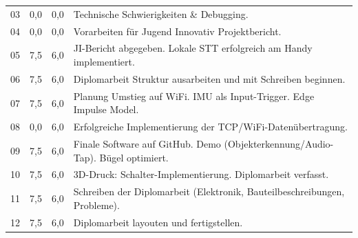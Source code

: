 \begin{longtable}{l r r p{\dimexpr\textwidth-4.5cm\relax}}
03 & 0,0 & 0,0 & Technische Schwierigkeiten \& Debugging. \\
04 & 0,0 & 0,0 & Vorarbeiten für Jugend Innovativ Projektbericht. \\
05 & 7,5 & 6,0 & JI-Bericht abgegeben. Lokale STT erfolgreich am Handy implementiert. \\
06 & 7,5 & 6,0 & Diplomarbeit Struktur ausarbeiten und mit Schreiben beginnen. \\
07 & 7,5 & 6,0 & Planung Umstieg auf WiFi. IMU als Input-Trigger. Edge Impulse Model. \\
08 & 0,0 & 6,0 & Erfolgreiche Implementierung der TCP/WiFi-Datenübertragung. \\
09 & 7,5 & 6,0 & Finale Software auf GitHub. Demo (Objekterkennung/Audio-Tap). Bügel optimiert. \\
10 & 7,5 & 6,0 & 3D-Druck: Schalter-Implementierung. Diplomarbeit verfasst. \\
11 & 7,5 & 6,0 & Schreiben der Diplomarbeit (Elektronik, Bauteilbeschreibungen, Probleme). \\
12 & 7,5 & 6,0 & Diplomarbeit layouten und fertigstellen. \\
\end{longtable}
\newpage

